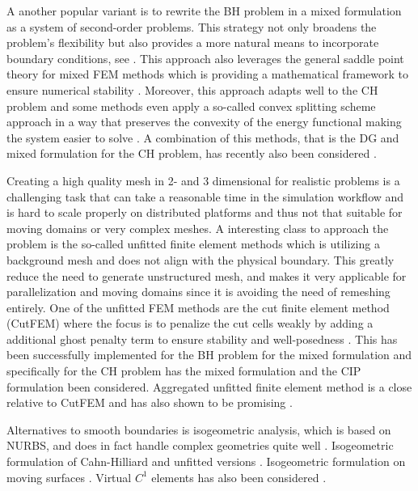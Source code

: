 A another popular variant is to rewrite the BH problem in a mixed formulation as a system of second-order problems. This strategy not only broadens the problem's flexibility but also provides a more natural means to incorporate boundary conditions,
see \cite{falk1978approximation,
ciarlet1974mixed, gudi2008mixed, cheng2000some}. This approach also leverages the general saddle point theory for mixed
FEM methods which is providing a mathematical framework to ensure numerical stability \cite{john2016finite}.
Moreover, this approach adapts well to the CH problem \cite{wells2006discontinuous,feng2004error} and some methods even apply a so-called convex splitting scheme approach in a way that preserves the convexity of the energy functional making the
system easier to solve \cite{diegel2015analysis, brenner2018robust}.
A combination of this methods, that is the DG and mixed formulation for the CH problem, has recently also been considered \cite{chave2016hybrid, medina2022stabilized}.

Creating a high quality mesh in 2- and 3 dimensional for realistic problems is a challenging task that can take a reasonable time in the simulation workflow and is hard to scale properly on distributed platforms and thus not that suitable for moving
domains or very complex meshes. A interesting class to approach the problem is the so-called unfitted finite element methods which is utilizing a background mesh and does not align with the physical boundary.
This greatly reduce the need to generate unstructured mesh, and makes it very applicable for parallelization and moving domains
since it is avoiding the need of remeshing entirely.
One of the unfitted FEM methods are the cut finite element method (CutFEM) where the focus is to penalize the cut cells weakly by adding a additional ghost penalty term to ensure stability and well-posedness \cite{burman2015cutfem}. This has been successfully implemented for the BH problem for the
mixed formulation \cite{cai2023nitsche} and specifically for the CH problem has the mixed formulation \cite{karatzas2021reduced} and the CIP formulation \cite{chen2023arbitrary} been considered.
 Aggregated unfitted finite element method is a close relative to CutFEM and has also shown to
be promising \cite{verdugo2019distributed, badia2018aggregated}.


Alternatives to smooth boundaries is isogeometric analysis, which is based on NURBS, and does in fact handle complex geometries quite well \cite{hughes2005isogeometric}.
 Isogeometric formulation of Cahn-Hilliard \cite{kastner2016isogeometric, gomez2008isogeometric} and unfitted versions \cite{zhao2017variational}. Isogeometric formulation on moving
surfaces \cite{zimmermann2019isogeometric}. Virtual $C^{1}$  elements has also been considered \cite{antonietti2016c}.


